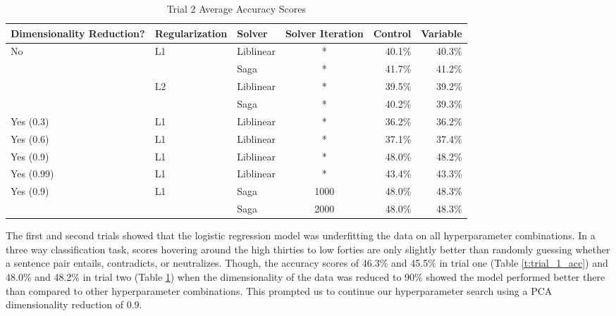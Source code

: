 \documentclass[12pt,letterpaper]{article}
\begin{document}
\begin{table}[!htbp]
    \centering
    \begin{tabular}{|l|l|l|c|r|r|}
    \hline
        Dimensionality Reduction? & Regularization & Solver & Solver Iteration & Control & Variable \\ \hline
        \multirow[t]{4}{*}{No} & \multirow{2}{*}{L1} & Liblinear & * &  40.1\% &  40.3\% \\ \cline{3-6}
        ~ & ~ & Saga & * &  41.7\% &  41.2\% \\ \cline{2-6}
        ~ & \multirow{2}{*}{L2} & Liblinear & * &  39.5\% &  39.2\% \\ \cline{3-6}
        ~ & ~ & Saga & * &  40.2\% &  39.3\% \\ \hline
        Yes (0.3) & L1 & Liblinear & * &  36.2\% & 36.2\% \\ \hline
        Yes (0.6) & L1 & Liblinear & * &  37.1\% & 37.4\% \\ \hline
        Yes (0.9) & L1 & Liblinear & * &  48.0\% & 48.2\% \\ \hline
        Yes (0.99) & L1 & Liblinear & * & 43.4\% & 43.3\% \\ \hline
        \multirow{2}{*}{Yes (0.9)} & \multirow{2}{*}{L1} & Saga & 1000 &  48.0\% & 48.3\% \\ \cline{3-6}
        ~ & ~ & Saga & 2000 &  48.0\% & 48.3\% \\ \hline
    \end{tabular}
    \caption{Trial 2 Average Accuracy Scores}
    \label{t:trial_2_acc}
\end{table}

The first and second trials showed that the logistic regression model was underfitting the data on all hyperparameter combinations. In a three way classification task, scores hovering around the high thirties to low forties are only slightly better than randomly guessing whether a sentence pair entails, contradicts, or neutralizes. Though, the accuracy scores of 46.3\% and 45.5\% in trial one (Table \ref{t:trial_1_acc}) and 48.0\% and 48.2\% in trial two (Table \ref{t:trial_2_acc}) when the dimensionality of the data was reduced to 90\% showed the model performed better there than compared to other hyperparameter combinations. This prompted us to continue our hyperparameter search using a PCA dimensionality reduction of 0.9.


\end{document}
